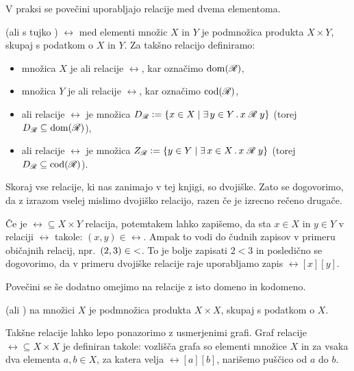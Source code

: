 		V praksi se povečini uporabljajo relacije med dvema elementoma.
		\begin{definicija}
			 (ali s tujko )  $\rel$ med elementi množic $X$ in $Y$ je podmnožica produkta $X \times Y$, skupaj s podatkom o $X$ in $Y$. Za takšno relacijo definiramo:
			\begin{itemize}
				\item
					množica $X$ je  ali  relacije $\rel$, kar označimo $\dom(\rel)$,
				\item
					množica $Y$ je  ali  relacije $\rel$, kar označimo $\cod(\rel)$,
				\item
					 ali  relacije $\rel$ je množica $\dd{\rel} \dfeq \set{x \in X}{\xsome{y}[Y]{\rel[x][y]}}$ (torej $\dd{\rel} \subseteq \dom(\rel)$),
				\item
					 ali  relacije $\rel$ je množica $\rn{\rel} \dfeq \set{y \in Y}{\xsome{x}[X]{\rel[x][y]}}$ (torej $\dd{\rel} \subseteq \cod(\rel)$). 
			\end{itemize}
		\end{definicija}
		
		Skoraj vse relacije, ki nas zanimajo v tej knjigi, so dvojiške. Zato se dogovorimo, da z izrazom  vselej mislimo dvojiško relacijo, razen če je izrecno rečeno drugače.
		
		Če je $\rel \subseteq X \times Y$ relacija, potemtakem lahko zapišemo, da sta $x \in X$ in $y \in Y$ v relaciji $\rel$ takole: $(x, y) \in \rel$. Ampak to vodi do čudnih zapisov v primeru običajnih relacij, npr.~$(2, 3) \in \mathnormal{<}$. To je bolje zapisati $2 < 3$ in posledično se dogovorimo, da v primeru dvojiške relacije raje uporabljamo zapis $\rel[x][y]$.
		
		Povečini se še dodatno omejimo na relacije z isto domeno in kodomeno.
		\begin{definicija}
			 (ali )  na množici $X$ je podmnožica produkta $X \times X$, skupaj s podatkom o $X$.
		\end{definicija}
		
		Takšne relacije lahko lepo ponazorimo z usmerjenimi grafi. Graf relacije $\rel \subseteq X \times X$ je definiran takole: vozlišča grafa so elementi množice $X$ in za vsaka dva elementa $a, b \in X$, za katera velja $\rel[a][b]$, narišemo puščico od $a$ do $b$.
		
